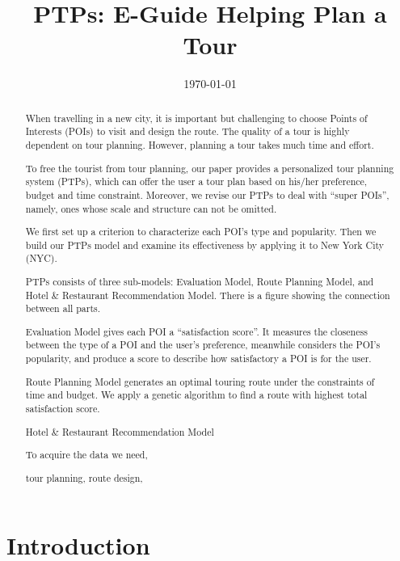 \documentclass{mcmthesis}
\begin{document}
\linespread{0.6}
\setlength{\parskip}{0.5\baselineskip}
\title{PTPs: E-Guide Helping Plan a Tour}%

\date{\today}
\begin{abstract}
    When travelling in a new city, it is important but challenging to choose Points of Interests (POIs) to visit and design the route. The quality of a tour is highly dependent on tour planning. However, planning a tour takes much time and effort. \par
  To free the tourist from tour planning, our paper provides a personalized tour planning system (PTPs), which can offer the user a tour plan based on his/her preference, budget and time constraint. Moreover, we revise our PTPs to deal with ``super POIs'', namely, ones whose scale and structure can not be omitted. \par
  We first set up a criterion to characterize each POI's type and popularity. Then we build our PTPs model and examine its effectiveness by applying it to New York City (NYC).\par
  PTPs consists of three sub-models: Evaluation Model, Route Planning Model, and Hotel \& Restaurant Recommendation Model. There is a figure showing the connection between all parts.\par
  Evaluation Model gives each POI a ``satisfaction score''. It measures the closeness between the type of a POI and the user's preference, meanwhile considers the POI's popularity, and produce a score to describe how satisfactory a POI is for the user.\par
  Route Planning Model generates an optimal touring route under the constraints of time and budget. We apply a genetic algorithm to find a route with highest total satisfaction score. \par
  Hotel \& Restaurant Recommendation Model 

  To acquire the data we need, 
	\begin{keywords}
    tour planning, route design, 
	\end{keywords}
\end{abstract}

\maketitle
\tableofcontents

\newpage

\section{Introduction}	
\end{document}

